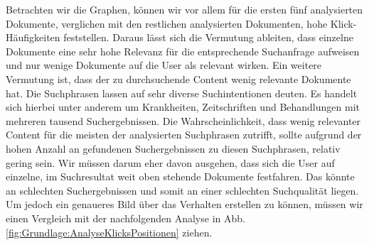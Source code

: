 Betrachten wir die Graphen, können wir vor allem für die ersten fünf analysierten Dokumente, verglichen mit den restlichen analysierten Dokumenten, hohe Klick-Häufigkeiten feststellen. Daraus lässt sich die Vermutung ableiten, dass einzelne Dokumente eine sehr hohe Relevanz für die entsprechende Suchanfrage aufweisen und nur wenige Dokumente auf die User als relevant wirken. Ein weitere Vermutung ist, dass der zu durchsuchende Content wenig relevante Dokumente hat. Die Suchphrasen lassen auf sehr diverse Suchintentionen deuten. Es handelt sich hierbei unter anderem um Krankheiten, Zeitschriften und Behandlungen mit mehreren tausend Suchergebnissen. Die Wahrscheinlichkeit, dass wenig relevanter Content für die meisten der analysierten Suchphrasen zutrifft, sollte aufgrund der hohen Anzahl an gefundenen Suchergebnissen zu diesen Suchphrasen, relativ gering sein. Wir müssen darum eher davon ausgehen, dass sich die User auf einzelne, im Suchresultat weit oben stehende Dokumente festfahren. Das könnte an schlechten Suchergebnissen und somit an einer schlechten Suchqualität liegen. Um jedoch ein genaueres Bild über das Verhalten erstellen zu können, müssen wir einen Vergleich mit der nachfolgenden Analyse in Abb. \ref{fig:Grundlage:AnalyseKlicksPositionen} ziehen.